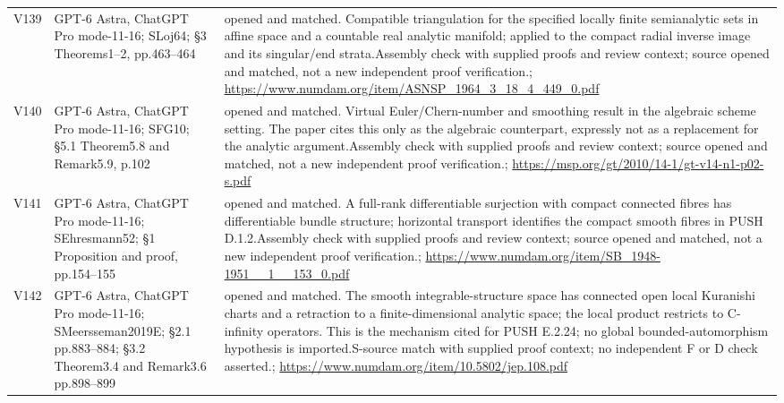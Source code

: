 \documentclass[11pt,a4paper]{article}
\theoremstyle{plain}
\theoremstyle{definition}
\begin{document}
\begin{longtable}{@{}L{.08\linewidth}L{.31\linewidth}L{.56\linewidth}@{}}
V139 & GPT-6 Astra, ChatGPT Pro mode-11-16; S\newline Loj64; §3 Theorems1--2, pp.463--464 & opened and matched. Compatible triangulation for the specified locally finite semianalytic sets in affine space and a countable real analytic manifold; applied to the compact radial inverse image and its singular/\allowbreak{}end strata.\newline Assembly check with supplied proofs and review context; source opened and matched, not a new independent proof verification.\newline {}; \url{https://www.numdam.org/item/ASNSP_1964_3_18_4_449_0.pdf}\\
V140 & GPT-6 Astra, ChatGPT Pro mode-11-16; S\newline FG10; §5.1 Theorem5.8 and Remark5.9, p.102 & opened and matched. Virtual Euler/\allowbreak{}Chern-number and smoothing result in the algebraic scheme setting. The paper cites this only as the algebraic counterpart, expressly not as a replacement for the analytic argument.\newline Assembly check with supplied proofs and review context; source opened and matched, not a new independent proof verification.\newline {}; \url{https://msp.org/gt/2010/14-1/gt-v14-n1-p02-s.pdf}\\
V141 & GPT-6 Astra, ChatGPT Pro mode-11-16; S\newline Ehresmann52; §1 Proposition and proof, pp.154--155 & opened and matched. A full-rank differentiable surjection with compact connected fibres has differentiable bundle structure; horizontal transport identifies the compact smooth fibres in PUSH D.1.2.\newline Assembly check with supplied proofs and review context; source opened and matched, not a new independent proof verification.\newline {}; \url{https://www.numdam.org/item/SB_1948-1951__1__153_0.pdf}\\
V142 & GPT-6 Astra, ChatGPT Pro mode-11-16; S\newline Meersseman2019E; §2.1 pp.883--884; §3.2 Theorem3.4 and Remark3.6 pp.898--899 & opened and matched. The smooth integrable-structure space has connected open local Kuranishi charts and a retraction to a finite-dimensional analytic space; the local product restricts to C-infinity operators. This is the mechanism cited for PUSH E.2.24; no global bounded-automorphism hypothesis is imported.\newline S-source match with supplied proof context; no independent F or D check asserted.\newline {}; \url{https://www.numdam.org/item/10.5802/jep.108.pdf}\\
\bottomrule\end{longtable}\endgroup
\end{document}
